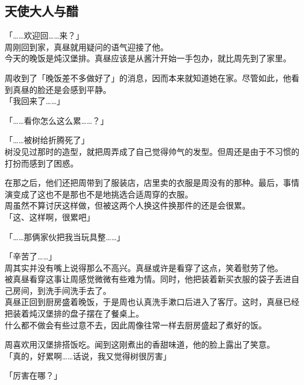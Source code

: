 \subsection{天使大人与醋}

「……欢迎回……来？」\\

周刚回到家，真昼就用疑问的语气迎接了他。\\

今天的晚饭是炖汉堡排。真昼应该是从酱汁开始一手包办，就比周先到了家里。

周收到了「晚饭差不多做好了」的消息，因而本来就知道她在家。尽管如此，他看到真昼的脸还是会感到平静。\\

「我回来了……」

「……看你怎么这么累……？」

「……被树给折腾死了」\\

树没见过那时的造型，就把周弄成了自己觉得帅气的发型。但周还是由于不习惯的打扮而感到了困惑。

在那之后，他们还把周带到了服装店，店里卖的衣服是周没有的那种。最后，事情演变成了这也不是那也不是地挑选合适周穿的衣服。\\

周虽然不算讨厌这样做，但被这两个人换这件换那件的还是会很累。\\

「这、这样啊，很累吧」

「……那俩家伙把我当玩具整……」

「辛苦了……」\\

周其实并没有嘴上说得那么不高兴。真昼或许是看穿了这点，笑着慰劳了他。\\

被真昼看穿这事让周感觉微微有些难为情。同时，他把装着新买衣服的袋子丢进自己房间，到洗手间洗手去了。\\

真昼正回到厨房盛着晚饭，于是周也认真洗手漱口后进入了客厅。这时，真昼已经把装着炖汉堡排的盘子摆在了餐桌上。\\

什么都不做会有些过意不去，因此周像往常一样去厨房盛起了煮好的饭。

周喜欢用汉堡排搭饭吃。闻到这刚煮出的香甜味道，他的脸上露出了笑意。\\

「真的，好累啊……话说，我又觉得树很厉害」

「厉害在哪？」\\

